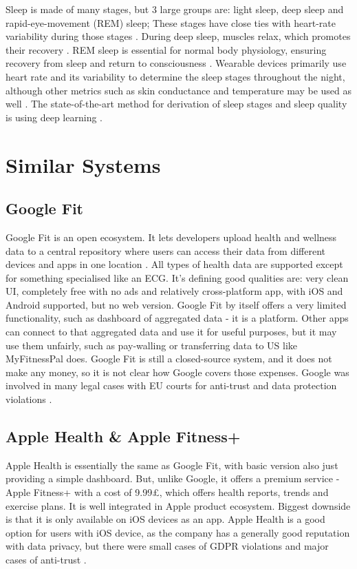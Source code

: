 Sleep is made of many stages, but 3 large groups are: light sleep, deep sleep and rapid-eye-movement (REM) sleep; These stages have close ties with heart-rate variability during those stages \cite{sleepDef}. During deep sleep, muscles relax, which promotes their recovery \cite{Jung2010Energy}. REM sleep is essential for normal body physiology, ensuring recovery from sleep and return to consciousness \cite{VERTES1986371}. Wearable devices primarily use heart rate and its variability to determine the sleep stages throughout the night, although other metrics such as skin conductance and temperature may be used as well \cite{Zambotti2019Wearable}. The state-of-the-art method for derivation of sleep stages and sleep quality is using deep learning \cite{Sathyanarayana2016Sleep}.

\section{Similar Systems}
\label{section:similarSystems}
\subsection{Google Fit}
Google Fit is an open ecosystem. It lets developers upload health and wellness data to a central repository where users can access their data from different devices and apps in one location \cite{googleFit}. All types of health data are supported except for something specialised like an ECG. It's defining good qualities are: very clean UI, completely free with no ads and relatively cross-platform app, with iOS and Android supported, but no web version.  Google Fit by itself offers a very limited functionality, such as dashboard of aggregated data - it is a platform. Other apps can connect to that aggregated data and use it for useful purposes, but it may use them unfairly, such as pay-walling or transferring data to US like MyFitnessPal does. Google Fit is still a closed-source system, and it does not make any money, so it is not clear how Google covers those expenses. Google was involved in many legal cases with EU courts for anti-trust \cite{googleAntiTrust} and data protection violations \cite{googleDataProtect, googleDataProtect2} .
\subsection{Apple Health \& Apple Fitness+}
Apple Health is essentially the same as Google Fit, with basic version also just providing a simple dashboard. But, unlike Google, it offers a premium service - Apple Fitness+ with a cost of 9.99£, which offers health reports, trends and exercise plans. It is well integrated in Apple product ecosystem. Biggest downside is that it is only available on iOS devices as an app. Apple Health is a good option for users with iOS device, as the company has a generally good reputation with data privacy, but there were small cases of GDPR violations \cite{CNILApple} and major cases of anti-trust \cite{appleAntiTrust}.
